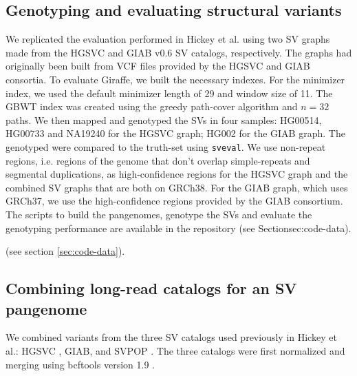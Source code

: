 \documentclass[11pt]{ucscthesis}
\begin{document}
\subsection{Genotyping and evaluating structural variants}
\label{subsec:svgenotyping}

We replicated the evaluation performed in Hickey et al.\cite{hickey_vgsv_2020} using two SV graphs made from the HGSVC\cite{chaisson_sv_2019} and GIAB v0.6\cite{zook_robust_2020} SV catalogs, respectively.
The graphs had originally been built from VCF files provided by the HGSVC and GIAB consortia.
To evaluate Giraffe, we built the necessary indexes.
For the minimizer index, we used the default minimizer length of 29 and window size of 11.
The GBWT index was created using the greedy path-cover algorithm and $n = 32$ paths.
We then mapped and genotyped the SVs in four samples: HG00514, HG00733 and NA19240 for the HGSVC graph; HG002 for the GIAB graph.
The genotyped were compared to the truth-set using \texttt{sveval}\cite{hickey_vgsv_2020}.
We use non-repeat regions, i.e. regions of the genome that don't overlap simple-repeats and segmental duplications, as high-confidence regions for the HGSVC graph and the combined SV graphs that are both on GRCh38.
For the GIAB graph, which uses GRCh37, we use the high-confidence regions provided by the GIAB consortium\cite{zook_robust_2020}.
The scripts to build the pangenomes, genotype the SVs and evaluate the genotyping performance are available in the repository (see Section{sec:code-data}).

(see section \ref{sec:code-data}).

\subsection{Combining long-read catalogs for an SV pangenome}
\label{subsec:svpangenome}

We combined variants from the three SV catalogs used previously in Hickey et al.\cite{hickey_vgsv_2020}: HGSVC \cite{chaisson_sv_2019}, GIAB\cite{zook_robust_2020}, and SVPOP \cite{audano2019c}.
The three catalogs were first normalized and merging using bcftools version 1.9 \cite{li_samtools_2011}.
\end{document}
